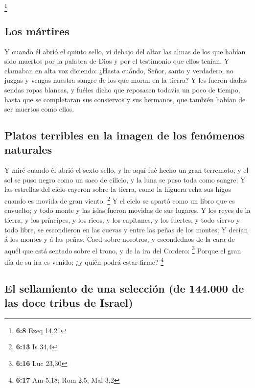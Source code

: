 \footnote{\textbf{6:8} Ezeq 14,21}

\hypertarget{los-muxe1rtires}{%
\subsection{Los mártires}\label{los-muxe1rtires}}

 Y cuando él abrió el quinto sello, vi debajo del altar las
almas de los que habían sido muertos por la palabra de Dios y por el
testimonio que ellos tenían.  Y clamaban en alta voz
diciendo: ¿Hasta cuándo, Señor, santo y verdadero, no juzgas y vengas
nuestra sangre de los que moran en la tierra?  Y les fueron
dadas sendas ropas blancas, y fuéles dicho que reposasen todavía un poco
de tiempo, hasta que se completaran sus consiervos y sus hermanos, que
también habían de ser muertos como ellos.

\hypertarget{platos-terribles-en-la-imagen-de-los-fenuxf3menos-naturales}{%
\subsection{Platos terribles en la imagen de los fenómenos
naturales}\label{platos-terribles-en-la-imagen-de-los-fenuxf3menos-naturales}}

 Y miré cuando él abrió el sexto sello, y he aquí fué hecho
un gran terremoto; y el sol se puso negro como un saco de cilicio, y la
luna se puso toda como sangre;  Y las estrellas del cielo
cayeron sobre la tierra, como la higuera echa sus higos cuando es movida
de gran viento. \footnote{\textbf{6:13} Is 34,4}  Y el
cielo se apartó como un libro que es envuelto; y todo monte y las islas
fueron movidas de sus lugares.  Y los reyes de la tierra, y
los príncipes, y los ricos, y los capitanes, y los fuertes, y todo
siervo y todo libre, se escondieron en las cuevas y entre las peñas de
los montes;  Y decían á los montes y á las peñas: Caed
sobre nosotros, y escondednos de la cara de aquél que está sentado sobre
el trono, y de la ira del Cordero: \footnote{\textbf{6:16} Luc 23,30}
 Porque el gran día de su ira es venido; ¿y quién podrá
estar firme? \footnote{\textbf{6:17} Am 5,18; Rom 2,5; Mal 3,2}

\hypertarget{el-sellamiento-de-una-selecciuxf3n-de-144.000-de-las-doce-tribus-de-israel}{%
\subsection{El sellamiento de una selección (de 144.000 de las doce
tribus de
Israel)}\label{el-sellamiento-de-una-selecciuxf3n-de-144.000-de-las-doce-tribus-de-israel}}

